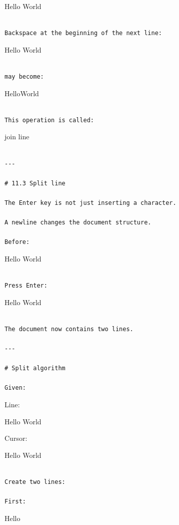 \documentclass[
  oneside,
  openany]{book}
\begin{document}
Hello\textbar{} World

\begin{verbatim}

Backspace at the beginning of the next line:
\end{verbatim}

Hello \textbar World

\begin{verbatim}

may become:
\end{verbatim}

HelloWorld

\begin{verbatim}

This operation is called:
\end{verbatim}

join line

\begin{verbatim}

---

# 11.3 Split line

The Enter key is not just inserting a character.

A newline changes the document structure.

Before:
\end{verbatim}

Hello World\textbar{}

\begin{verbatim}

Press Enter:
\end{verbatim}

Hello World \textbar{}

\begin{verbatim}

The document now contains two lines.

---

# Split algorithm

Given:
\end{verbatim}

Line:

Hello World

Cursor:

Hello \textbar World

\begin{verbatim}

Create two lines:

First:
\end{verbatim}

Hello
\end{document}

